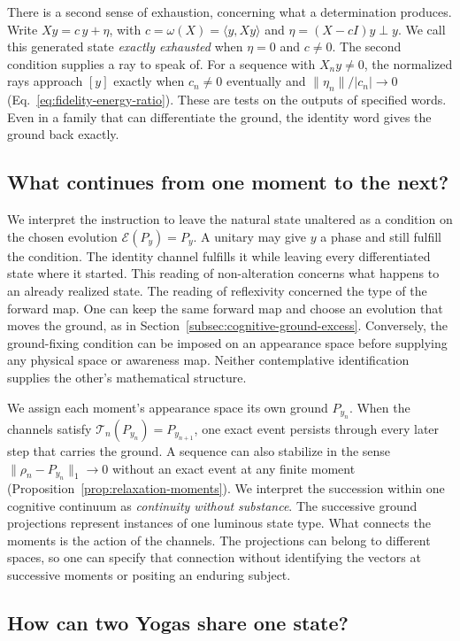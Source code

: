 \documentclass[11pt]{article}
\theoremstyle{definition}
\begin{document}
There is a second sense of exhaustion, concerning what a determination produces. Write $Xy=c\,y+\eta$, with $c=\omega(X)=\langle y,Xy\rangle$ and $\eta=(X-cI)y\perp y$. We call this generated state \emph{exactly exhausted} when $\eta=0$ and $c\ne0$. The second condition supplies a ray to speak of. For a sequence with $X_ny\ne0$, the normalized rays approach $[y]$ exactly when $c_n\ne0$ eventually and $\|\eta_n\|/|c_n|\to0$ (Eq.~\eqref{eq:fidelity-energy-ratio}). These are tests on the outputs of specified words. Even in a family that can differentiate the ground, the identity word gives the ground back exactly.

\subsection{What continues from one moment to the next?}
\label{subsec:realization-moments}

We interpret the instruction to leave the natural state unaltered as a condition on the chosen evolution $\mathcal E(P_y)=P_y$. A unitary may give $y$ a phase and still fulfill the condition. The identity channel fulfills it while leaving every differentiated state where it started. This reading of non-alteration concerns what happens to an already realized state. The reading of reflexivity concerned the type of the forward map. One can keep the same forward map and choose an evolution that moves the ground, as in Section~\ref{subsec:cognitive-ground-excess}. Conversely, the ground-fixing condition can be imposed on an appearance space before supplying any physical space or awareness map. Neither contemplative identification supplies the other's mathematical structure.

We assign each moment's appearance space its own ground $P_{y_n}$. When the channels satisfy $\mathcal T_n(P_{y_n})=P_{y_{n+1}}$, one exact event persists through every later step that carries the ground. A sequence can also stabilize in the sense $\|\rho_n-P_{y_n}\|_1\to0$ without an exact event at any finite moment (Proposition~\ref{prop:relaxation-moments}). We interpret the succession within one cognitive continuum as \emph{continuity without substance}. The successive ground projections represent instances of one luminous state type. What connects the moments is the action of the channels. The projections can belong to different spaces, so one can specify that connection without identifying the vectors at successive moments or positing an enduring subject.

\subsection{How can two Yogas share one state?}
\label{subsec:realization-yogas}
\end{document}
